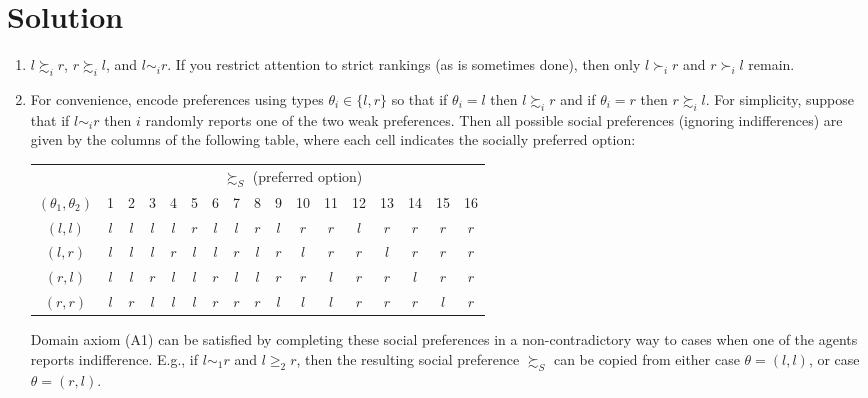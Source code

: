 \documentclass[a4paper]{article}
\newif\ifsolutions
\begin{document}
\ifsolutions
\section*{Solution}
	\begin{enumerate}
		\item $l \succsim_i r$, $r \succsim_i l$, and $l \sim_i r$. If you restrict attention to strict rankings (as is sometimes done), then only $l \succ_i r$ and $r \succ_i l$ remain.
		
		\item For convenience, encode preferences using types $\theta_i \in \{l,r\}$ so that if $\theta_i=l$ then $l \succsim_i r$ and if $\theta_i=r$ then $r \succsim_i l$. For simplicity, suppose that if $l \sim_i r$ then $i$ randomly reports one of the two weak preferences.
		Then all possible social preferences (ignoring indifferences) are given by the columns of the following table, where each cell indicates the socially preferred option:
		\begin{center}
		\begin{tabular}{c|c c c c c c c c c c c c c c c c|}
			& \multicolumn{16}{c}{$\succsim_S$ (preferred option)}
			\\
			$(\theta_1,\theta_2)$ & 1 & 2 & 3 & 4 & 5 & 6 & 7 & 8 & 9 & 10 & 11 & 12 & 13 & 14 & 15 & 16
			\\ \hline 
			$(l,l)$ & $l$ & $l$ & $l$ & $l$ & $r$ & $l$ & $l$ & $r$ & $l$ & $r$ & $r$ & $l$ & $r$ & $r$ & $r$ & $r$
			\\
			$(l,r)$ & $l$ & $l$ & $l$ & $r$ & $l$ & $l$ & $r$ & $l$ & $r$ & $l$ & $r$ & $r$ & $l$ & $r$ & $r$ & $r$
			\\
			$(r,l)$ & $l$ & $l$ & $r$ & $l$ & $l$ & $r$ & $l$ & $l$ & $r$ & $r$ & $l$ & $r$ & $r$ & $l$ & $r$ & $r$
			\\
			$(r,r)$ & $l$ & $r$ & $l$ & $l$ & $l$ & $r$ & $r$ & $r$ & $l$ & $l$ & $l$ & $r$ & $r$ & $r$ & $l$ & $r$
			\\ \hline
		\end{tabular}
		\end{center}
		Domain axiom (A1) can be satisfied by completing these social preferences in a non-contradictory way to cases when one of the agents reports indifference. E.g., if $l \sim_1 r$ and $l \geq_2 r$, then the resulting social preference $\succsim_S$ can be copied from either case $\theta=(l,l)$, or case $\theta=(r,l)$. 
		

\end{enumerate}
\end{document}
